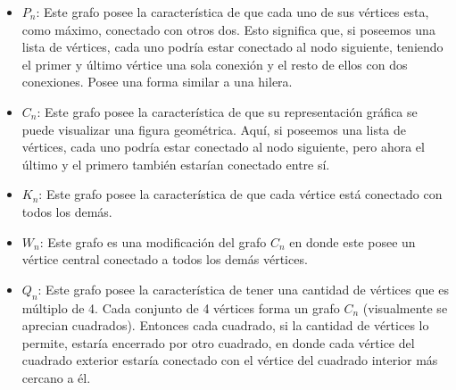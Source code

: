 \documentclass[spanish, fleqn]{article}
\begin{document}
\begin{enumerate}
\begin{itemize}
\item $P_{n}$: Este grafo posee la característica de que cada uno de sus vértices esta, como máximo, conectado con otros dos. Esto significa que, si poseemos una lista de vértices, cada uno podría estar conectado al nodo siguiente, teniendo el primer y último vértice una sola conexión y el resto de ellos con dos conexiones. Posee una forma similar a una hilera.
\item $C_{n}$: Este grafo posee la característica de que su representación gráfica se puede visualizar una figura geométrica. Aquí, si poseemos una lista de vértices, cada uno podría estar conectado al nodo siguiente, pero ahora el último y el primero también estarían conectado entre sí. 
\item $K_{n}$: Este grafo posee la característica de que cada vértice está conectado con todos los demás.
\item $W_{n}$: Este grafo es una modificación del grafo $C_{n}$ en donde este posee un vértice central conectado a todos los demás vértices. 
\item $Q_{n}$: Este grafo posee la característica de tener una cantidad de vértices que es múltiplo de 4. Cada conjunto de 4 vértices forma un grafo $C_{n}$ (visualmente se aprecian cuadrados). Entonces cada cuadrado, si la cantidad de vértices lo permite, estaría encerrado por otro cuadrado, en donde cada vértice del cuadrado exterior estaría conectado con el vértice del cuadrado interior más cercano a él.
\end{itemize}  
\end{enumerate}
\end{document}
